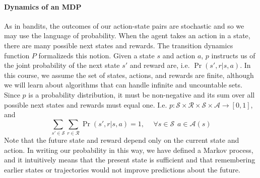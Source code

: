 \documentclass[12pt]{article}
\begin{document}
\paragraph{Dynamics of an MDP} As in bandits, the outcomes of our action-state pairs are stochastic and so we may use the language of probability. When the agent takes an action in a state, there are many possible next states and rewards. The transition dynamics function $P$ formalizeds this notion. Given a state $s$ and action $a$, $p$ instructs us of the joint probability of the next state $s'$ and reward are, i.e. $\Pr(s', r | s, a)$. In this course, we assume the set of states, actions, and rewards are finite, although we will learn about algorithms that can handle infinite and uncountable sets. Since $p$ is a probability distribution, it must be non-negative and its sum over all possible next states and rewards must equal one. I.e. $p : \mathcal S \times \mathcal R \times \mathcal S \times \mathcal A \to [0,1]$, and
\[
  \sum_{s' \in \mathcal S} \sum_{r \in \mathcal R} \Pr(s', r | s, a) = 1, \hspace{15pt} \forall s \in \mathcal S \hspace{5pt} a \in \mathcal A(s)
\]
Note that the future state and reward depend only on the current state and action. In writing our probability in this way, we have defined a Markov process, and it intuitively means that the present state is sufficient and that remembering earlier states or trajectories would not improve predictions about the future.
\end{document}
